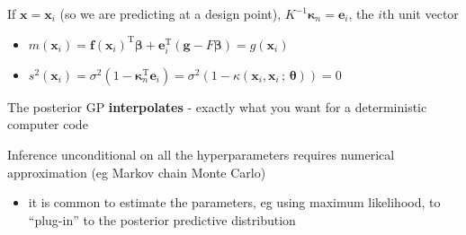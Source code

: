 \documentclass[
  ignorenonframetext,
]{beamer}
\providecommand{\tightlist}{%
  \setlength{\itemsep}{0pt}\setlength{\parskip}{0pt}}
\begin{document}
\begin{frame}{}
\protect\hypertarget{section-45}{}
If \(\boldsymbol{x}= \boldsymbol{x}_i\) (so we are predicting at a
design point), \(K^{-1}\boldsymbol{\kappa}_n = \boldsymbol{e}_i\), the
\(i\)th unit vector

\begin{itemize}
\tightlist
\item
  \(m(\boldsymbol{x}_i) = \boldsymbol{f}(\boldsymbol{x}_i)^\mathrm{T}\boldsymbol{\beta}+ \boldsymbol{e}_i^\mathrm{T}(\boldsymbol{g}- F\boldsymbol{\beta}) = g(\boldsymbol{x}_i)\)
\item
  \(s^2(\boldsymbol{x}_i) = \sigma^2\left(1 - \boldsymbol{\kappa}_n^\mathrm{T}\boldsymbol{e}_i\right) = \sigma^2\left(1 - \kappa(\boldsymbol{x}_i,\boldsymbol{x}_i\,;\,\boldsymbol{\theta})\right) = 0\)
\end{itemize}

The posterior GP \textbf{interpolates} - exactly what you want for a
deterministic computer code

Inference unconditional on all the hyperparameters requires numerical
approximation (eg Markov chain Monte Carlo)

\begin{itemize}
\tightlist
\item
  it is common to estimate the parameters, eg using maximum likelihood,
  to ``plug-in'' to the posterior predictive distribution
\end{itemize}
\end{frame}
\end{document}
